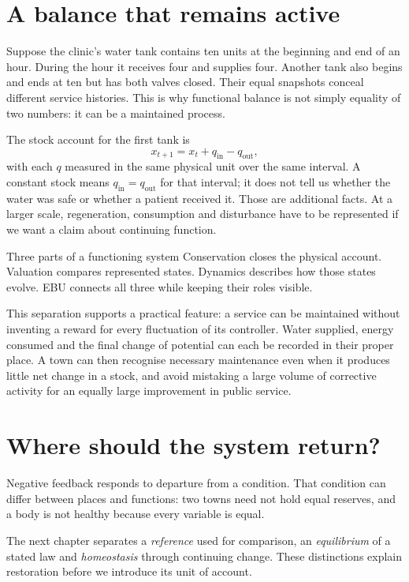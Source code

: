 \section{A balance that remains active}
Suppose the clinic's water tank contains ten units at the beginning and end of an hour. During the hour it receives four and supplies four. Another tank also begins and ends at ten but has both valves closed. Their equal snapshots conceal different service histories. This is why functional balance is not simply equality of two numbers: it can be a maintained process.

The stock account for the first tank is
\begin{equation}
 x_{t+1}=x_t+q_{\mathrm{in}}-q_{\mathrm{out}},
\end{equation}
with each $q$ measured in the same physical unit over the same interval. A constant stock means $q_{\mathrm{in}}=q_{\mathrm{out}}$ for that interval; it does not tell us whether the water was safe or whether a patient received it. Those are additional facts. At a larger scale, regeneration, consumption and disturbance have to be represented if we want a claim about continuing function.

\begin{intuitionbox}{Three parts of a functioning system}
Conservation closes the physical account. Valuation compares represented states. Dynamics describes how those states evolve. EBU connects all three while keeping their roles visible.
\end{intuitionbox}

This separation supports a practical feature: a service can be maintained without inventing a reward for every fluctuation of its controller. Water supplied, energy consumed and the final change of potential can each be recorded in their proper place. A town can then recognise necessary maintenance even when it produces little net change in a stock, and avoid mistaking a large volume of corrective activity for an equally large improvement in public service.

\section{Where should the system return?}
Negative feedback responds to departure from a condition. That condition can differ between places and functions: two towns need not hold equal reserves, and a body is not healthy because every variable is equal.

The next chapter separates a \emph{reference} used for comparison, an \emph{equilibrium} of a stated law and \emph{homeostasis} through continuing change. These distinctions explain restoration before we introduce its unit of account.
